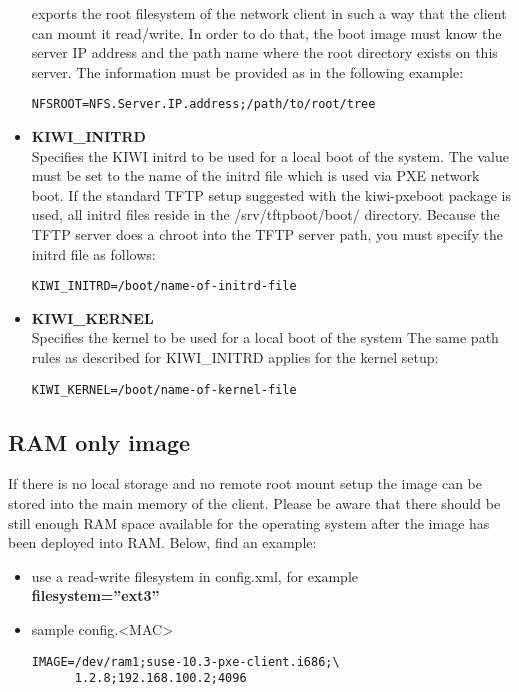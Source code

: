 \begin{itemize}
         exports the root filesystem of the network client in such a
         way that the client can mount it read/write. In order to do
         that, the boot image must know the server IP address and
         the path name where the root directory
         exists on this server. The information must be provided as
         in the following example:
\begin{verbatim}
NFSROOT=NFS.Server.IP.address;/path/to/root/tree
\end{verbatim}
    \item \textbf{KIWI\_INITRD}\\
         Specifies the KIWI initrd to be used for a local boot of the system.
         The value must be set to the name of the initrd file which is
         used via PXE network boot. If the standard TFTP setup suggested
         with the kiwi-pxeboot package is used, all initrd files reside
         in the /srv/tftpboot/boot/ directory. Because the TFTP server
         does a chroot into the TFTP server path, you must specify the
         initrd file as follows:
\begin{verbatim}
KIWI_INITRD=/boot/name-of-initrd-file
\end{verbatim}
    \item \textbf{KIWI\_KERNEL}\\
         Specifies the kernel to be used for a local boot of the system
         The same path rules as described for KIWI\_INITRD applies for
         the kernel setup:
\begin{verbatim}
KIWI_KERNEL=/boot/name-of-kernel-file
\end{verbatim}
\end{itemize}

\subsection{RAM only image}

If there is no local storage and no remote root mount setup
the image can be stored into the main memory of the client.
Please be aware that there should be still enough RAM space
available for the operating system after the image has been
deployed into RAM. Below, find an example:

\begin{itemize}
\item use a read-write filesystem in config.xml, for example\\
      \textbf{filesystem=''ext3''}
\item sample config.<MAC>

\begin{Command}{12cm}
\begin{verbatim}
IMAGE=/dev/ram1;suse-10.3-pxe-client.i686;\
      1.2.8;192.168.100.2;4096
\end{verbatim}
\end{Command}
\end{itemize}

